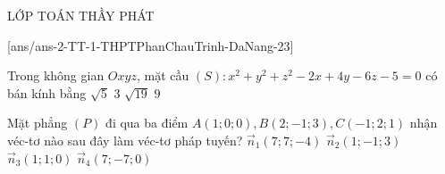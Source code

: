 \begin{name}
	{\tenchude}{\tendethi}{LỚP TOÁN THẦY PHÁT}{\thoigian}
\end{name}
[ans/ans-2-TT-1-THPTPhanChauTrinh-DaNang-23]
\setcounter{ex}{0}\setcounter{bt}{0}
\begin{ex}%
	Trong không gian $Oxyz$, mặt cầu $(S)\colon x^2+y^2+z^2-2x+4y-6z-5=0$ có bán kính bằng 
	\choice
	{$\sqrt{5}$}
	{$3$}
	{\True $\sqrt{19}$}
	{$9$}
\end{ex}
\begin{ex}%
	Mặt phẳng $(P)$ đi qua ba điểm $A(1; 0; 0), B(2;-1; 3), C(-1; 2; 1)$ nhận véc-tơ nào sau đây làm véc-tơ pháp tuyến?
	\choice
	{$\vec{n}_1(7; 7;-4)$}
	{$\vec{n}_2(1;-1; 3)$}
	{\True $\vec{n}_3(1; 1; 0)$}
	{$\vec{n}_4(7;-7; 0)$}
\end{ex}


